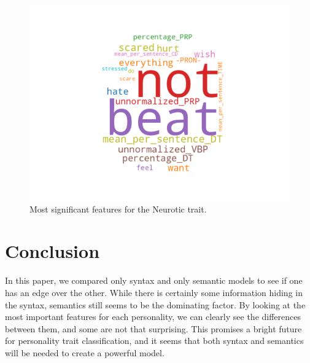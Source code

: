 \documentclass[10pt, a4paper]{article}
\begin{document}
\begin{figure}
\begin{center}
  \includegraphics[width=\columnwidth]{figures/cNEU.png}
  \caption{Most significant features for the Neurotic trait.}
  \label{fig:figure5}
\end{center}
\end{figure}

\section{Conclusion}
In this paper, we compared only syntax and only semantic models to see if one has an edge over the other.
While there is certainly some information hiding in the syntax, semantics still seems to be the dominating factor.
By looking at the most important features for each personality, we can clearly see the differences between them, and some are not that surprising.
This promises a bright future for personality trait classification, and it seems that both syntax and semantics will be needed to create a powerful model.



\end{document}
